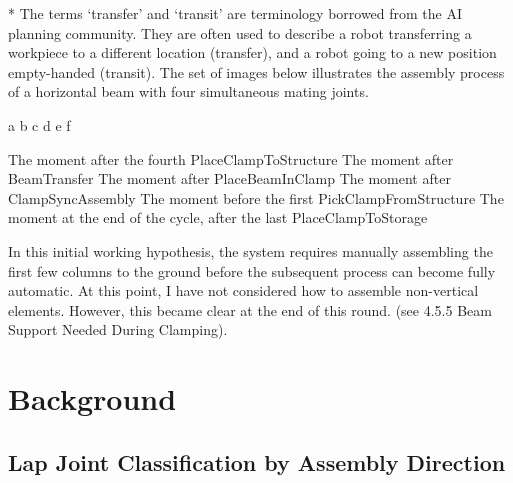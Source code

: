 * The terms ‘transfer’ and ‘transit’ are terminology borrowed from the AI planning community. They are often used to describe a robot transferring a workpiece to a different location (transfer), and a robot going to a new position empty-handed (transit).
The set of images below illustrates the assembly process of a horizontal beam with four simultaneous mating joints. 

a
b
c
d
e
f

The moment after the fourth PlaceClampToStructure 
The moment after BeamTransfer
The moment after PlaceBeamInClamp
The moment after ClampSyncAssembly
The moment before the first PickClampFromStructure
The moment at the end of the cycle, after the last PlaceClampToStorage

In this initial working hypothesis, the system requires manually assembling the first few columns to the ground before the subsequent process can become fully automatic. At this point, I have not considered how to assemble non-vertical elements. However, this became clear at the end of this round. (see  4.5.5 Beam Support Needed During Clamping).

\section{Background}
\label{section:exploration_1_background}

\subsection{Lap Joint Classification by Assembly Direction}
\label{subsection:exploration_1_lap_joint_classification_by_assembly_direction}

